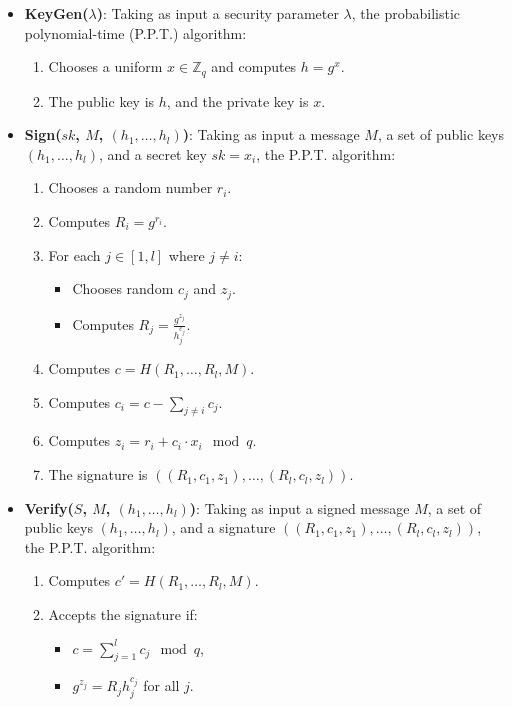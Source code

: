 \documentclass[12pt]{article}
\begin{document}
\begin{itemize}
    \item \textbf{KeyGen(\(\lambda\))}: Taking as input a security parameter \( \lambda \), the probabilistic polynomial-time (P.P.T.) algorithm:
    \begin{enumerate}
        \item Chooses a uniform \( x \in \mathbb{Z}_q \) and computes \( h = g^x \).
        \item The public key is \( h \), and the private key is \( x \).
    \end{enumerate}
    
    \item \textbf{Sign(\(sk\), \(M\), \((h_1, \dots, h_l)\))}: Taking as input a message \( M \), a set of public keys \( (h_1, \dots, h_l) \), and a secret key \( sk = x_i \), the P.P.T. algorithm:
    \begin{enumerate}
        \item Chooses a random number \( r_i \).
        \item Computes \( R_i = g^{r_i} \).
        \item For each \( j \in [1, l] \) where \( j \neq i \):
        \begin{itemize}
            \item Chooses random \( c_j \) and \( z_j \).
            \item Computes \( R_j = \frac{g^{z_j}}{h_j^{c_j}} \).
        \end{itemize}
        \item Computes \( c = H(R_1, \dots, R_l, M) \).
        \item Computes \( c_i = c - \sum_{j \neq i} c_j \).
        \item Computes \( z_i = r_i + c_i \cdot x_i \mod q \).
        \item The signature is \( ((R_1, c_1, z_1), \dots, (R_l, c_l, z_l)) \).
    \end{enumerate}
    
    \item \textbf{Verify(\(S\), \(M\), \((h_1, \dots, h_l)\))}: Taking as input a signed message \( M \), a set of public keys \( (h_1, \dots, h_l) \), and a signature \( ((R_1, c_1, z_1), \dots, (R_l, c_l, z_l)) \), the P.P.T. algorithm:
    \begin{enumerate}
        \item Computes \( c' = H(R_1, \dots, R_l, M) \).
        \item Accepts the signature if:
        \begin{itemize}
            \item \( c = \sum_{j=1}^{l} c_j \mod q \),
            \item \( g^{z_j} = R_j h_j^{c_j} \) for all \( j \).
        \end{itemize}
    \end{enumerate}
\end{itemize}
\end{document}
